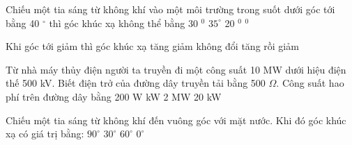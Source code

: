 \begin{ex}
	Chiếu một tia sáng từ không khí vào một môi trường trong suốt dưới góc tới bằng 40 $\mathrm{^\circ}$ thì góc khúc xạ không thể bằng
	\choice
	{30 $^0$}
	{$35^\circ$}
	{20 $^0$}
	{ $^0$}
	\loigiai{}
\end{ex}

\begin{ex}
	Khi góc tới giảm thì góc khúc xạ
	\choice
	{tăng}
	{\True giảm}
	{không đổi}
	{tăng rồi giảm}
	\loigiai{}
\end{ex}

\begin{ex}
	Từ nhà máy thủy điện người ta truyền đi một công suất 10 MW dưới hiệu điện thế 500 kV. Biết điện trở của đường dây truyền tải bằng 500 $\Omega$. Công suất hao phí trên đường dây bằng
	\choice
	{200 W}
	{ kW}
	{2 MW}
	{20 kW}
	\loigiai{}
\end{ex}
\begin{ex}
	Chiếu một tia sáng từ không khí đến vuông góc với mặt nước. Khi đó góc khúc xạ có giá trị bằng:
	\choice
	{$90^\circ$}
	{$30^\circ$}
	{$60^\circ$}
	{\True $0^\circ$}
	\loigiai{}
\end{ex}


